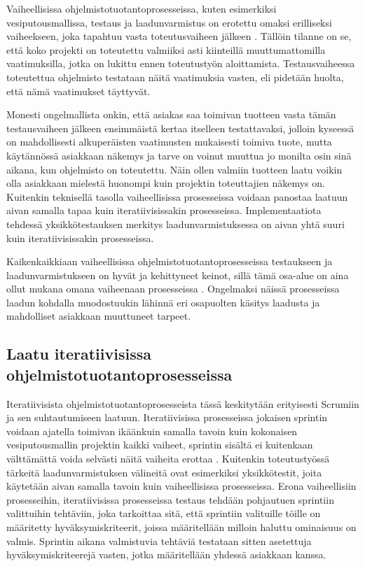 \documentclass[finnish,nonumbib,nocopyright]{gradu2}
\begin{document}
Vaiheellisissa ohjelmistotuotantoprosesseissa, kuten esimerkiksi vesiputousmallissa, testaus ja laadunvarmistus on erotettu omaksi erilliseksi vaiheekseen, joka tapahtuu vasta toteutusvaiheen jälkeen \cite{managing}. Tällöin tilanne on se, että koko projekti on toteutettu valmiiksi asti kiinteillä muuttumattomilla vaatimuksilla, jotka on lukittu ennen toteutustyön aloittamista. Testausvaiheessa toteutettua ohjelmisto testataan näitä vaatimuksia vasten, eli pidetään huolta, että nämä vaatimukset täyttyvät. 

Monesti ongelmallista onkin, että asiakas saa toimivan tuotteen vasta tämän testausvaiheen jälkeen ensimmäistä kertaa itselleen testattavaksi, jolloin kyseessä on mahdollisesti alkuperäisten vaatimusten mukaisesti toimiva tuote, mutta käytännössä asiakkaan näkemys ja tarve on voinut muuttua jo monilta osin sinä aikana, kun ohjelmisto on toteutettu. Näin ollen valmiin tuotteen laatu voikin olla asiakkaan mielestä huonompi kuin projektin toteuttajien näkemys on. Kuitenkin teknisellä tasolla vaiheellisissa prosesseissa voidaan panostaa laatuun aivan samalla tapaa kuin iteratiivisissakin prosesseissa. Implementaatiota tehdessä yksikkötestauksen merkitys laadunvarmistuksessa on aivan yhtä suuri kuin iteratiivisissakin prosesseissa.

Kaikenkaikkiaan vaiheellisissa ohjelmistotuotantoprosesseissa testaukseen ja laadunvarmistukseen on hyvät ja kehittyneet keinot, sillä tämä osa-alue on aina ollut mukana omana vaiheenaan prosesseissa \cite{agilequality}. Ongelmaksi näissä prosesseissa laadun kohdalla muodostuukin lähinnä eri osapuolten käsitys laadusta ja mahdolliset asiakkaan muuttuneet tarpeet.

\subsection{Laatu iteratiivisissa ohjelmistotuotantoprosesseissa}

Iteratiivisista ohjelmistotuotantoprosesseista tässä keskitytään erityisesti Scrumiin ja sen suhtautumiseen laatuun. Iteratiivisissa prosesseissa jokaisen sprintin voidaan ajatella toimivan ikäänkuin samalla tavoin kuin kokonaisen vesiputousmallin projektin kaikki vaiheet, sprintin sisältä ei kuitenkaan välttämättä voida selvästi näitä vaiheita erottaa \cite{agilequality}. Kuitenkin toteutustyössä tärkeitä laadunvarmistuksen välineitä ovat esimerkiksi yksikkötestit, joita käytetään aivan samalla tavoin kuin vaiheellisissa prosesseissa. Erona vaiheellisiin prosesseihin, iteratiivisissa prosesseissa testaus tehdään pohjautuen sprintiin valittuihin tehtäviin, joka tarkoittaa sitä, että sprintiin valituille töille on määritetty hyväksymiskriteerit, joissa määritellään milloin haluttu ominaisuus on valmis. Sprintin aikana valmistuvia tehtäviä testataan sitten asetettuja hyväksymiskriteerejä vasten, jotka määritellään yhdessä asiakkaan kanssa.
\end{document}

